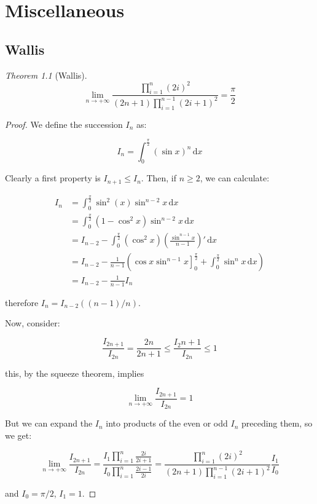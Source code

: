 \documentclass[12pt,a4paper]{report}
\numberwithin{equation}{section}
\theoremstyle{definition}
\theoremstyle{remark}
\newtheorem{theorem}{Theorem}[section]
\begin{document}
\chapter{Miscellaneous}

\section{Wallis}

\begin{theorem}[Wallis]
\begin{equation}
\lim_{n\rightarrow +\infty} \frac{\displaystyle\prod_{i=1}^{n} (2i)^2}{(2n+1)\displaystyle \prod _{i=1}^{n-1} (2i+1)^2}  = \frac{\pi}{2}
\end{equation}
\end{theorem}

\begin{proof}
We define the succession $I_n$ as:

\begin{equation}
I_n = \int^{\frac{\pi}{2}}_{0} (\sin x )^n \, \text{d}x
\end{equation}

Clearly a first property is $I_{n+1} \leq I_n$. Then, if $n\geq 2$, we can calculate:

\begin{align*}
I_n &= \int^{\frac{\pi}{2}}_{0} \sin^2 (x) \sin^{n-2} x \, \text{d}x\\
&= \int^{\frac{\pi}{2}}_{0} (1-\cos^2 x) \sin^{n-2} x \, \text{d}x\\
&= I_{n-2} -\int^{\frac{\pi}{2}}_{0} (\cos^2 x) \left( \frac{\sin^{n-1} x}{n-1} \right)' \, \text{d}x\\
&= I_{n-2} -\frac{1}{n-1} \left(\left. \cos x \sin^{n-1} x \right]^{\frac{\pi}{2}}_0 + \int^{\frac{\pi}{2}}_{0} \sin^n x \, \text{d}x \right)\\
&= I_{n-2} - \frac{1}{n-1} I_n
\end{align*}

therefore $I_n = I_{n-2} ((n-1)/n)$.

Now, consider:

\begin{equation}
\frac{I_{2n+1}}{I_{2n}} = \frac{2n}{2n+1}\leq \frac{I_2n+1}{I_{2n}} \leq 1
\end{equation}

this, by the squeeze theorem, implies

\begin{equation}
\lim_{n\rightarrow +\infty} \frac{I_{2n+1}}{I_{2n}} =1
\end{equation}

But we can expand the $I_n$ into products of the even or odd $I_n$ preceding them, so we get:

\begin{equation}
\lim_{n\rightarrow+\infty} \frac{I_{2n+1}}{I_{2n}} = \frac{I_1 \displaystyle\prod_{i=1}^{n} \frac{2i}{2i+1}}{I_0 \displaystyle \prod _{i=1}^{n} \frac{2i-1}{2i}} = \frac{\displaystyle\prod_{i=1}^{n} (2i)^2}{(2n+1)\displaystyle \prod _{i=1}^{n-1} (2i+1)^2} \frac{I_1}{I_0}
\end{equation}

and $I_0 = \pi /2$, $I_1 = 1$.
\end{proof}
\end{document}
